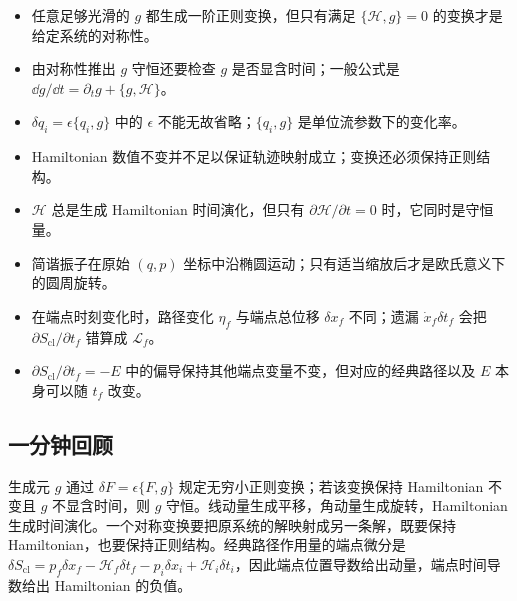 \begin{itemize}[leftmargin=*]
  \item 任意足够光滑的 $g$ 都生成一阶正则变换，但只有满足 $\{\mathcal H,g\}=0$ 的变换才是给定系统的对称性。
  \item 由对称性推出 $g$ 守恒还要检查 $g$ 是否显含时间；一般公式是 $\dd g/\dd t=\partial_tg+\{g,\mathcal H\}$。
  \item $\delta q_i=\epsilon\{q_i,g\}$ 中的 $\epsilon$ 不能无故省略；$\{q_i,g\}$ 是单位流参数下的变化率。
  \item Hamiltonian 数值不变并不足以保证轨迹映射成立；变换还必须保持正则结构。
  \item $\mathcal H$ 总是生成 Hamiltonian 时间演化，但只有 $\partial\mathcal H/\partial t=0$ 时，它同时是守恒量。
  \item 简谐振子在原始 $(q,p)$ 坐标中沿椭圆运动；只有适当缩放后才是欧氏意义下的圆周旋转。
  \item 在端点时刻变化时，路径变化 $\eta_f$ 与端点总位移 $\delta x_f$ 不同；遗漏 $\dot x_f\delta t_f$ 会把 $\partial S_{\mathrm{cl}}/\partial t_f$ 错算成 $\mathcal L_f$。
  \item $\partial S_{\mathrm{cl}}/\partial t_f=-E$ 中的偏导保持其他端点变量不变，但对应的经典路径以及 $E$ 本身可以随 $t_f$ 改变。
\end{itemize}

\subsection{一分钟回顾}

生成元 $g$ 通过 $\delta F=\epsilon\{F,g\}$ 规定无穷小正则变换；若该变换保持 Hamiltonian 不变且 $g$ 不显含时间，则 $g$ 守恒。线动量生成平移，角动量生成旋转，Hamiltonian 生成时间演化。一个对称变换要把原系统的解映射成另一条解，既要保持 Hamiltonian，也要保持正则结构。经典路径作用量的端点微分是 $\delta S_{\mathrm{cl}}=p_f\delta x_f-\mathcal H_f\delta t_f-p_i\delta x_i+\mathcal H_i\delta t_i$，因此端点位置导数给出动量，端点时间导数给出 Hamiltonian 的负值。

